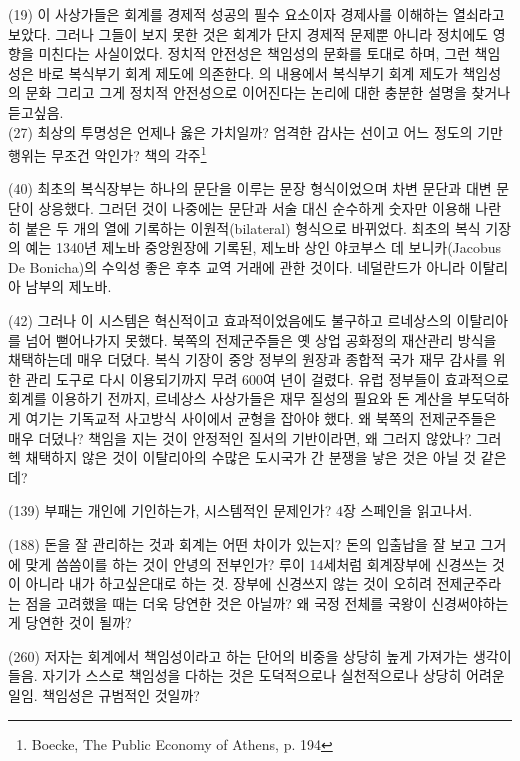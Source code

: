 \documentclass[11pt, a4paper]{article}
\begin{document}
(19) 이 사상가들은 회계를 경제적 성공의 필수 요소이자 경제사를 이해하는 열쇠라고 보았다. 그러나 그들이 보지 못한 것은 회계가 단지 경제적 문제뿐 아니라 정치에도 영향을 미친다는 사실이었다. 정치적 안전성은 책임성의 문화를 토대로 하며, 그런 책임성은 바로 복식부기 회계 제도에 의존한다. 의 내용에서 복식부기 회계 제도가 책임성의 문화 그리고 그게 정치적 안전성으로 이어진다는 논리에 대한 충분한 설명을 찾거나 듣고싶음. \\ 

(27) 최상의 투명성은 언제나 옳은 가치일까? 엄격한 감사는 선이고 어느 정도의 기만행위는 무조건 악인가? 책의 각주\footnote{Boecke, The Public Economy of Athens, p. 194} 

(40) 최초의 복식장부는 하나의 문단을 이루는 문장 형식이었으며 차변 문단과 대변 문단이 상응했다. 그러던 것이 나중에는 문단과 서술 대신 순수하게 숫자만 이용해 나란히 붙은 두 개의 열에 기록하는 이원적(bilateral) 형식으로 바뀌었다. 최초의 복식 기장의 예는 1340년 제노바 중앙원장에 기록된, 제노바 상인 야코부스 데 보니카(Jacobus De Bonicha)의 수익성 좋은 후추 교역 거래에 관한 것이다. 네덜란드가 아니라 이탈리아 남부의 제노바.

(42) 그러나 이 시스템은 혁신적이고 효과적이었음에도 불구하고 르네상스의 이탈리아를 넘어 뻗어나가지 못했다. 북쪽의 전제군주들은 옛 상업 공화정의 재산관리 방식을 채택하는데 매우 더뎠다. 복식 기장이 중앙 정부의 원장과 종합적 국가 재무 감사를 위한 관리 도구로 다시 이용되기까지 무려 600여 년이 걸렸다. 유럽 정부들이 효과적으로 회계를 이용하기 전까지, 르네상스 사상가들은 재무 질성의 필요와 돈 계산을 부도덕하게 여기는 기독교적 사고방식 사이에서 균형을 잡아야 했다. 왜 북쪽의 전제군주들은 매우 더뎠나? 책임을 지는 것이 안정적인 질서의 기반이라면, 왜 그러지 않았나? 그러헥 채택하지 않은 것이 이탈리아의 수많은 도시국가 간 분쟁을 낳은 것은 아닐 것 같은데?

(139) 부패는 개인에 기인하는가, 시스템적인 문제인가? 4장 스페인을 읽고나서. 

(188) 돈을 잘 관리하는 것과 회계는 어떤 차이가 있는지? 돈의 입출납을 잘 보고 그거에 맞게 씀씀이를 하는 것이 안녕의 전부인가? 루이 14세처럼 회계장부에 신경쓰는 것이 아니라 내가 하고싶은대로 하는 것. 장부에 신경쓰지 않는 것이 오히려 전제군주라는 점을 고려했을 때는 더욱 당연한 것은 아닐까? 왜 국정 전체를 국왕이 신경써야하는게 당연한 것이 될까?


(260) 저자는 회계에서 책임성이라고 하는 단어의 비중을 상당히 높게 가져가는 생각이 들음. 자기가 스스로 책임성을 다하는 것은 도덕적으로나 실천적으로나 상당히 어려운 일임. 책임성은 규범적인 것일까?
\end{document}
